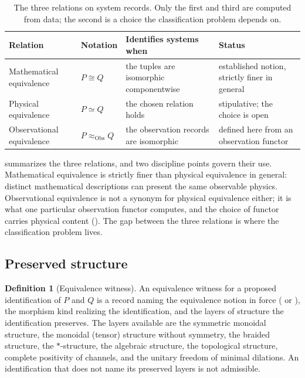 \documentclass[11pt,letterpaper]{article}
\theoremstyle{definition}
\newtheorem{definition}[theorem]{Definition}
\theoremstyle{remark}
\begin{document}
\begin{table}[t]
\centering
\small
\begin{tabularx}{\textwidth}{@{} L{0.17\textwidth} L{0.19\textwidth} X L{0.24\textwidth} @{}}
\toprule
Relation & Notation & Identifies systems when & Status \\
\midrule
Mathematical equivalence & $P \cong Q$ & the tuples are isomorphic componentwise & established notion, strictly finer in general \\
Physical equivalence & $P \simeq Q$ & the chosen relation holds & stipulative; the choice is open \\
Observational equivalence & $P \approx_{\mathrm{Obs}} Q$ & the observation records are isomorphic & defined here from an observation functor \\
\bottomrule
\end{tabularx}
\caption{The three relations on system records. Only the first and third are computed from data; the second is a choice the classification problem depends on.}
\label{tab:relations}
\end{table}

 summarizes the three relations, and two discipline points govern their use. Mathematical equivalence is strictly finer than physical equivalence in general: distinct mathematical descriptions can present the same observable physics. Observational equivalence is not a synonym for physical equivalence either; it is what one particular observation functor computes, and the choice of functor carries physical content (). The gap between the three relations is where the classification problem lives.

\subsection{Preserved structure}

\begin{definition}[Equivalence witness]
\label{def:witness}
An equivalence witness for a proposed identification of $P$ and $Q$ is a record naming the equivalence notion in force ( or ), the morphism kind realizing the identification, and the layers of structure the identification preserves. The layers available are the symmetric monoidal structure, the monoidal (tensor) structure without symmetry, the braided structure, the $*$-structure, the algebraic structure, the topological structure, complete positivity of channels, and the unitary freedom of minimal dilations. An identification that does not name its preserved layers is not admissible.
\end{definition}
\end{document}
